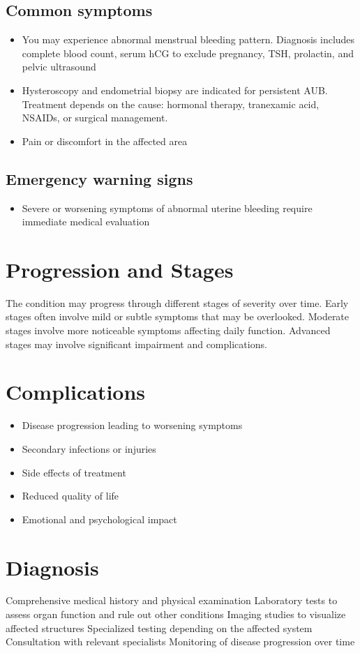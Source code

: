 \subsection{Common symptoms}
\begin{itemize}[noitemsep]
  \item You may experience abnormal menstrual bleeding pattern. Diagnosis includes complete blood count, serum hCG to exclude pregnancy, TSH, prolactin, and pelvic ultrasound
  \item Hysteroscopy and endometrial biopsy are indicated for persistent AUB. Treatment depends on the cause: hormonal therapy, tranexamic acid, NSAIDs, or surgical management.
  \item Pain or discomfort in the affected area
  \end{itemize}

\subsection{Emergency warning signs}
\begin{itemize}[noitemsep]
  \item Severe or worsening symptoms of abnormal uterine bleeding require immediate medical evaluation
\end{itemize}
\section{Progression and Stages}
The condition may progress through different stages of severity over time. Early stages often involve mild or subtle symptoms that may be overlooked. Moderate stages involve more noticeable symptoms affecting daily function. Advanced stages may involve significant impairment and complications.
\section{Complications}
\begin{itemize}[noitemsep]
  \item Disease progression leading to worsening symptoms
  \item Secondary infections or injuries
  \item Side effects of treatment
  \item Reduced quality of life
  \item Emotional and psychological impact
\end{itemize}
\section{Diagnosis}
Comprehensive medical history and physical examination Laboratory tests to assess organ function and rule out other conditions Imaging studies to visualize affected structures Specialized testing depending on the affected system Consultation with relevant specialists Monitoring of disease progression over time

